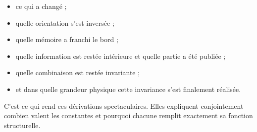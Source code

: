 \begin{itemize}[leftmargin=*,itemsep=0.35em]
\item ce qui a changé ;
\item quelle orientation s’est inversée ;
\item quelle mémoire a franchi le bord ;
\item quelle information est restée intérieure et quelle partie a été publiée ;
\item quelle combinaison est restée invariante ;
\item et dans quelle grandeur physique cette invariance s’est finalement réalisée.
\end{itemize}

C’est ce qui rend ces dérivations spectaculaires. Elles expliquent conjointement combien valent les constantes et pourquoi chacune remplit exactement sa fonction structurelle.\par
